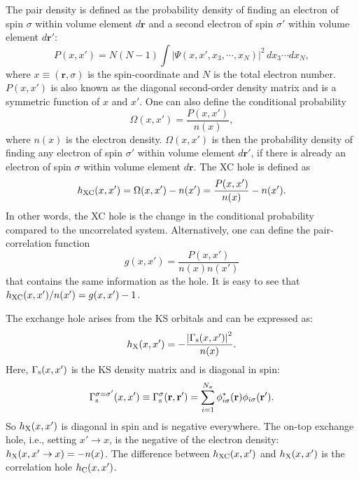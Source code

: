\documentclass[aip, amsmath, amssymb, reprint, longbibliography]{revtex4-2}
\begin{document}
The pair density is defined as the probability density of finding an electron of spin $\sigma$ within volume element $d\mathbf{r}$ and a second electron of spin $\sigma'$ within volume element $d\mathbf{r}'$:
\begin{equation}
P(x,x')=N(N-1)\int\left|\Psi(x,x',x_3,\cdots,x_N)\right|^2\,dx_3\cdots dx_N,
\label{eq:pairdensity}
\end{equation}
where $x\equiv(\mathbf{r},\sigma)$ is the spin-coordinate and $N$ is the total electron number. $P(x,x')$ is also known as the diagonal second-order density matrix and is a symmetric function of $x$ and $x'$. One can also define the conditional probability
\begin{equation}
\Omega(x,x')=\frac{P(x,x')}{n(x)},
\label{eq:condprob}
\end{equation}
where $n(x)$ is the electron density. $\Omega(x,x')$ is then the probability density of finding any electron of spin $\sigma'$ within volume element $d\mathbf{r}'$, if there is already an electron of spin $\sigma$ within volume element $d\mathbf{r}$. The XC hole is defined as
\begin{equation}
h_{\rm XC}(x,x')=\Omega(x,x')-n(x')=\frac{P(x,x')}{n(x)}-n(x').
\label{eq:xchole}
\end{equation}
In other words, the XC hole is the change in the conditional probability compared to the uncorrelated system. Alternatively, one can define the pair-correlation function
\begin{equation}
g(x,x')=\frac{P(x,x')}{n(x)n(x')}
\end{equation}
that contains the same information as the hole. It is easy to see that $h_{\rm XC}(x,x')/n(x')=g(x,x')-1$.

The exchange hole arises from the KS orbitals and can be expressed as:
\begin{equation}
h_{\rm X}(x,x')=-\frac{\left|\Gamma_{\rm s}(x,x')\right|^2}{n(x)}.
\label{eq:xhole}
\end{equation}
Here, $\Gamma_{\rm s}(x,x')$ is the KS density matrix and is diagonal in spin:
\begin{equation}
\Gamma_{\rm s}^{\sigma=\sigma'}(x,x')\equiv\Gamma_{\rm s}^{\sigma}(\mathbf{r},\mathbf{r}')=\sum_{i=1}^{N_\sigma}\phi_{i\sigma}^*(\mathbf{r})\phi_{i\sigma}(\mathbf{r}').
\label{eq:ksdm}
\end{equation}
So $h_{\rm X}(x,x')$ is diagonal in spin and is negative everywhere. The on-top exchange hole, i.e., 
 setting $x'\to x$, is the negative of the electron density: $h_{\rm X}(x,x'\to x)=-n(x)$. The difference between $h_{\rm XC}(x,x')$ and $h_{\rm X}(x,x')$ is the correlation hole $h_{\rm C}(x,x')$. 
 
\end{document}
